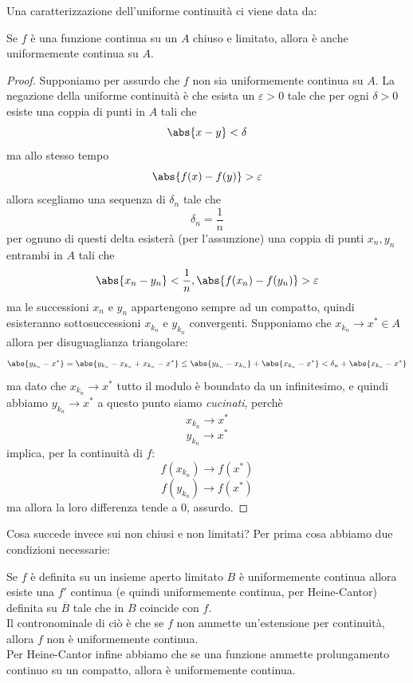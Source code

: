 \documentclass[11pt]{scrartcl}
\begin{document}
	Una caratterizzazione dell'uniforme continuità ci viene data da:
	\begin{theorem}
		Se $f$ è una funzione continua su un $A$ chiuso e limitato, allora è anche uniformemente continua su $A$.
	\end{theorem}
	\begin{proof}
		Supponiamo per assurdo che $f$ non sia uniformemente continua su $A$. La negazione della uniforme continuità è che esista un $\varepsilon>0$ tale che per ogni $\delta>0$ esiste una coppia di punti in $A$ tali che
		$$\abs{x-y}<\delta$$
		ma allo stesso tempo 
		$$\abs{f(x)-f(y)}>\varepsilon$$
		allora scegliamo una sequenza di $\delta_n$ tale che 
		$$\delta_n=\frac{1}{n}$$
		per ognuno di questi delta esisterà (per l'assunzione) una coppia di punti $x_n,y_n$ entrambi in $A$ tali che
		$$\abs{x_n-y_n}<\frac{1}{n},\abs{f(x_n)-f(y_n)}>\varepsilon$$
		ma le successioni $x_n$ e $y_n$ appartengono sempre ad un compatto, quindi esisteranno sottosuccessioni $x_{k_n}$ e $y_{k_n}$ convergenti. Supponiamo che $x_{k_n}\to x^*\in A$ allora per disuguaglianza triangolare:
		$$\abs{y_{k_n}-x^*}=\abs{y_{k_n}-x_{k_n}+x_{k_n}-x^*}\le \abs{y_{k_n}-x_{k_n}}+\abs{x_{k_n}-x^*}< \delta_n + \abs{x_{k_n}-x^*}$$
		ma dato che $x_{k_n}\to x^*$ tutto il modulo è boundato da un infinitesimo, e quindi abbiamo $y_{k_n}\to x^*$ a questo punto siamo \textit{cucinati}, perchè
		$$x_{k_n}\to x^*$$
		$$y_{k_n}\to x^*$$
		implica, per la continuità di $f$:
		$$f(x_{k_n})\to f(x^*)$$
		$$f(y_{k_n})\to f(x^*)$$
		ma allora la loro differenza tende a $0$, assurdo.
	\end{proof}
	Cosa succede invece sui non chiusi e non limitati? Per prima cosa abbiamo due condizioni necessarie:
	\begin{theorem}
		Se $f$ è definita su un insieme aperto limitato $B$ è uniformemente continua allora esiste una $f'$ continua (e quindi uniformemente continua, per Heine-Cantor) definita su $\overline{B}$ tale che in $B$ coincide con $f$. \\
		Il contronominale di ciò è che se $f$ non ammette un'estensione per continuità, allora $f$ non è uniformemente continua. \\
		Per Heine-Cantor infine abbiamo che se una funzione ammette prolungamento continuo su un compatto, allora è uniformemente continua.
	\end{theorem}
\end{document}
